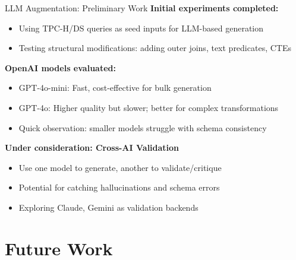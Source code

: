 \documentclass[aspectratio=169]{beamer}
\begin{document}
\begin{frame}{LLM Augmentation: Preliminary Work}
    \textbf{Initial experiments completed:}
    \begin{itemize}
        \item Using TPC-H/DS queries as seed inputs for LLM-based generation
        \item Testing structural modifications: adding outer joins, text predicates, CTEs
    \end{itemize}
    
    \vspace{0.3cm}
    \textbf{OpenAI models evaluated:}
    \begin{itemize}
        \item GPT-4o-mini: Fast, cost-effective for bulk generation
        \item GPT-4o: Higher quality but slower; better for complex transformations
        \item Quick observation: smaller models struggle with schema consistency
    \end{itemize}
    
    \vspace{0.3cm}
    \textbf{Under consideration: Cross-AI Validation}
    \begin{itemize}
        \item Use one model to generate, another to validate/critique
        \item Potential for catching hallucinations and schema errors
        \item Exploring Claude, Gemini as validation backends
    \end{itemize}
\end{frame}

\section{Future Work}
\end{document}
